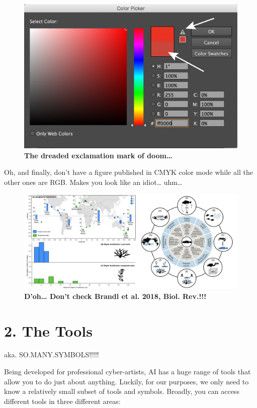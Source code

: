 \documentclass[]{article}
\begin{document}
\begin{figure}
\centering
\includegraphics{ColorPanel.png}
\caption{\textbf{The dreaded exclamation mark of doom\ldots{}}}
\end{figure}

Oh, and finally, don't have a figure published in CMYK color mode while
all the other ones are RGB. Makes you look like an idiot\ldots{}
uhm\ldots{}

\begin{figure}
\centering
\includegraphics{BrandlFig.png}
\caption{\textbf{D'oh\ldots{} Don't check Brandl et al. 2018, Biol.
Rev.!!!}}
\end{figure}

\section{2. The Tools}\label{the-tools}

aka. SO.MANY.SYMBOLS!!!!!

Being developed for professional cyber-artists, AI has a huge range of
tools that allow you to do just about anything. Luckily, for our
purposes, we only need to know a relatively small subset of tools and
symbols. Broadly, you can access different tools in three different
areas:
\end{document}
